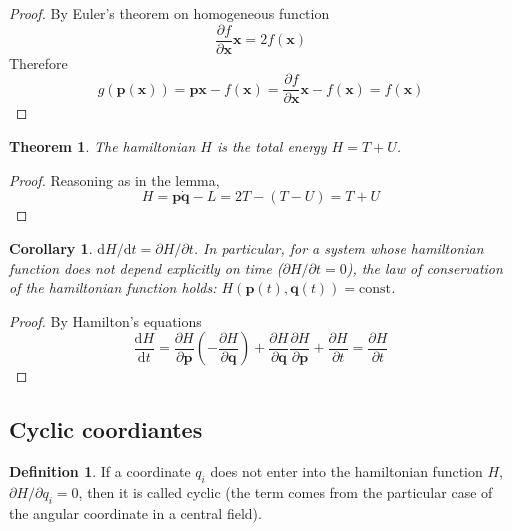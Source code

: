 \documentclass[conference]{IEEEtran}
\newtheorem{theorem}{Theorem}[section]
\newtheorem{corollary}{Corollary}
\theoremstyle{definition}
\newtheorem{definition}{Definition}[section]
\theoremstyle{remark}
\begin{document}
    \begin{proof}
        By Euler's theorem on homogeneous function
        \begin{equation*}
            \dfrac{\partial f}{\partial \mathbf{x}} \mathbf{x} = 2f(\mathbf{x})
        \end{equation*}
        Therefore
        \begin{equation*}
            g(\mathbf{p}(\mathbf{x})) = \mathbf{px} - f(\mathbf{x}) = \dfrac{\partial f}{\partial \mathbf{x}} \mathbf{x} - f(\mathbf{x}) = f(\mathbf{x})
        \end{equation*}
    \end{proof}

    \begin{theorem}
        The hamiltonian $H$ is the total energy $H = T + U$.
    \end{theorem}

    \begin{proof}
        Reasoning as in the lemma,
        \begin{equation*}
            H = \mathbf{p} \dot{\mathbf{q}} - L = 2T - (T - U) = T + U
        \end{equation*}
    \end{proof}

    \begin{corollary}
        $\mathrm{d} H / \mathrm{d} t = \partial H / \partial t$. In particular, for a system whose hamiltonian function does not depend explicitly on time ($\partial H / \partial t = 0$), the law of conservation of the hamiltonian function holds: $H(\mathbf{p}(t), \mathbf{q}(t)) = \text{const}$.
    \end{corollary}

    \begin{proof}
        By Hamilton's equations
        \begin{equation*}
            \dfrac{\mathrm{d} H}{\mathrm{d} t} = \dfrac{\partial H}{\partial \mathbf{p}} \left( -\dfrac{\partial H}{\partial \mathbf{q}} \right) + \dfrac{\partial H}{\partial \mathbf{q}} \dfrac{\partial H}{\partial \mathbf{p}} + \dfrac{\partial H}{\partial t} = \dfrac{\partial H}{\partial t}
        \end{equation*}
    \end{proof}

    \subsection{Cyclic coordiantes}
    \begin{definition}
        If a coordinate $q_i$ does not enter into the hamiltonian function $H$, $\partial H / \partial q_i = 0$, then it is called cyclic (the term comes from the particular case of the angular coordinate in a central field).
    \end{definition}
\end{document}
